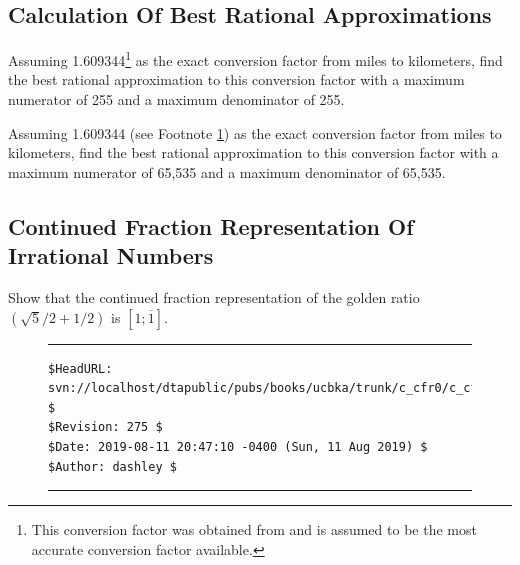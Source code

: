 \subsection{Calculation Of Best Rational Approximations}

\begin{vworkexercisestatement}
\label{exe:cfr0:sexe0:b01}
Assuming 1.609344\footnote{\label{footnote:exe:cfr0:sexe0:b01}This 
conversion factor was
obtained from \cite{bibref:b:nistsp811:1995ed} and is
assumed to be the most accurate conversion factor available.} 
as the exact conversion factor from miles to
kilometers, find the best rational approximation to this
conversion factor with a maximum numerator of 255 and a maximum
denominator of 255.
\end{vworkexercisestatement}

\begin{vworkexercisestatement}
\label{exe:cfr0:sexe0:b02}
Assuming 1.609344 (see Footnote \ref{footnote:exe:cfr0:sexe0:b01})
as the exact conversion factor from miles to
kilometers, find the best rational approximation to this
conversion factor with a maximum numerator of 65,535 and a maximum
denominator of 65,535.
\end{vworkexercisestatement}

\subsection{Continued Fraction Representation Of Irrational Numbers}

\begin{vworkexercisestatement}
\label{exe:cfr0:sexe0:c01}
Show that the continued fraction representation of the 
golden ratio $(\sqrt{5}/2 + 1/2)$ is $[1;\overline{1}]$.
\end{vworkexercisestatement}

\vworkexercisefooter{}



\noindent\begin{figure}[!b]
\noindent\rule[-0.25in]{\textwidth}{1pt}
\begin{tiny}
\begin{verbatim}
$HeadURL: svn://localhost/dtapublic/pubs/books/ucbka/trunk/c_cfr0/c_cfr0.tex $
$Revision: 275 $
$Date: 2019-08-11 20:47:10 -0400 (Sun, 11 Aug 2019) $
$Author: dashley $
\end{verbatim}
\end{tiny}
\noindent\rule[0.25in]{\textwidth}{1pt}
\end{figure}

%
